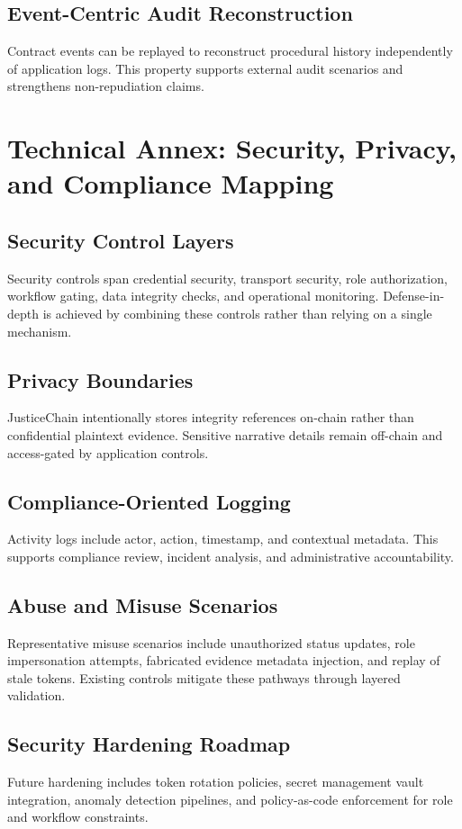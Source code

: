\documentclass[conference]{IEEEtran}
\begin{document}
\subsection{Event-Centric Audit Reconstruction}
Contract events can be replayed to reconstruct procedural history independently of application logs. This property supports external audit scenarios and strengthens non-repudiation claims.

\section{Technical Annex: Security, Privacy, and Compliance Mapping}
\subsection{Security Control Layers}
Security controls span credential security, transport security, role authorization, workflow gating, data integrity checks, and operational monitoring. Defense-in-depth is achieved by combining these controls rather than relying on a single mechanism.

\subsection{Privacy Boundaries}
JusticeChain intentionally stores integrity references on-chain rather than confidential plaintext evidence. Sensitive narrative details remain off-chain and access-gated by application controls.

\subsection{Compliance-Oriented Logging}
Activity logs include actor, action, timestamp, and contextual metadata. This supports compliance review, incident analysis, and administrative accountability.

\subsection{Abuse and Misuse Scenarios}
Representative misuse scenarios include unauthorized status updates, role impersonation attempts, fabricated evidence metadata injection, and replay of stale tokens. Existing controls mitigate these pathways through layered validation.

\subsection{Security Hardening Roadmap}
Future hardening includes token rotation policies, secret management vault integration, anomaly detection pipelines, and policy-as-code enforcement for role and workflow constraints.
\end{document}
